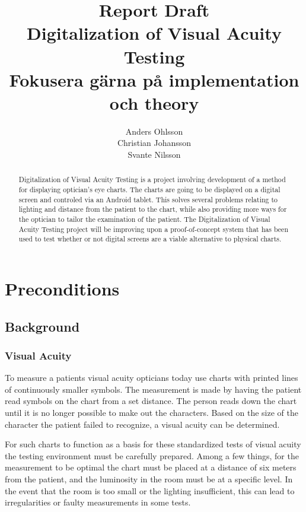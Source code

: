 \documentclass[12pt,a4paper,notitlepage]{report}
\begin{document}
\title{Report Draft\\Digitalization of Visual Acuity Testing\\
Fokusera gärna på implementation och theory}
\author{Anders Ohlsson\\Christian Johansson\\Svante Nilsson}
\maketitle

\begin{abstract}
Digitalization of Visual Acuity Testing is a project involving development of a method for displaying optician's eye charts. The charts are going to be displayed on a digital screen and controled via an Android tablet. This solves several problems relating to lighting and distance from the patient to the chart, while also providing more ways for the optician to tailor the examination of the patient. The Digitalization of Visual Acuity Testing project will be improving upon a proof-of-concept system that has been used to test whether or not digital screens are a viable alternative to physical charts.
\end{abstract}
\thispagestyle{empty}
\clearpage

\tableofcontents
\thispagestyle{empty}
\clearpage

\setcounter{page}{1}
\chapter{Preconditions}
\section{Background}
\subsection{Visual Acuity}
To measure a patients visual acuity opticians today use charts with printed lines of continuously smaller symbols. The measurement is made by having the patient read symbols on the chart from a set distance. The person reads down the chart until it is no longer possible to make out the characters. Based on the size of the character the patient failed to recognize, a visual acuity can be determined. 

For such charts to function as a basis for these standardized tests of visual acuity the testing environment must be carefully prepared. Among a few things, for the measurement to be optimal the chart must be placed at a distance of six meters from the patient, and the luminosity in the room must be at a specific level. In the event that the room is too small or the lighting insufficient, this can lead to irregularities or faulty measurements in some tests. 
\end{document}
